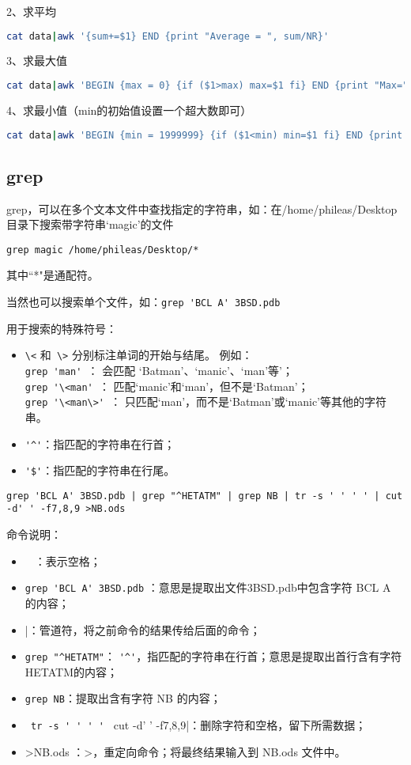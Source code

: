 2、求平均
\begin{lstlisting}[language=sh]
cat data|awk '{sum+=$1} END {print "Average = ", sum/NR}'
\end{lstlisting}

3、求最大值
\begin{lstlisting}[language=sh]
cat data|awk 'BEGIN {max = 0} {if ($1>max) max=$1 fi} END {print "Max=", max}'
\end{lstlisting}

4、求最小值（min的初始值设置一个超大数即可）
\begin{lstlisting}[language=sh]
cat data|awk 'BEGIN {min = 1999999} {if ($1<min) min=$1 fi} END {print "Min=", min}'
\end{lstlisting}



\subsection{grep}
grep，可以在多个文本文件中查找指定的字符串，如：在/home/phileas/Desktop目录下搜索带字符串‘magic’的文件

\verb|grep magic /home/phileas/Desktop/*|

其中``*"是通配符。

当然也可以搜索单个文件，如：\verb*[grep 'BCL A' 3BSD.pdb[

用于搜索的特殊符号：
\begin{itemize}
\item \verb|\<| 和\verb| \>| 分别标注单词的开始与结尾。 例如：\\ 
\verb|grep 'man' |： 会匹配 ‘Batman’、‘manic’、‘man’等'；\\
\verb|grep '\<man' |： 匹配‘manic’和‘man’，但不是‘Batman’；\\ 
\verb|grep '\<man\>' |： 只匹配‘man’，而不是‘Batman’或‘manic’等其他的字符串。 

\item \verb|'^'|：指匹配的字符串在行首；

\item \verb|'$'|：指匹配的字符串在行尾。
\end{itemize}


 \verb*[grep 'BCL A' 3BSD.pdb | grep "^HETATM" | grep NB | tr -s ' ' ' ' | cut -d' ' -f7,8,9 >NB.ods[ 

命令说明：
\begin{itemize}
\item \verb*| | ：表示空格；
\item \verb*[grep 'BCL A' 3BSD.pdb[ ：意思是提取出文件3BSD.pdb中包含字符 BCL A 的内容；
\item |：管道符，将之前命令的结果传给后面的命令；
\item \verb*[grep "^HETATM"[： \verb|'^'|，指匹配的字符串在行首；意思是提取出首行含有字符HETATM的内容；
\item \verb*|grep NB|：提取出含有字符 NB 的内容；
\item \verb*| tr -s ' ' ' ' | cut -d' ' -f7,8,9|：删除字符和空格，留下所需数据；
\item >NB.ods ：>，重定向命令；将最终结果输入到 NB.ods 文件中。
\end{itemize}




